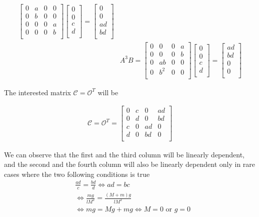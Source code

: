 \documentclass [12pt,letterpaper]{exam}
\begin{document}
\begin{align}
\begin{bmatrix}
0 & a & 0 & 0 \\
0 & b & 0 & 0 \\
0 & 0 & 0 & a \\
0 & 0 & 0 & b \\
\end{bmatrix} \begin{bmatrix}
0 \\
0 \\
c \\
d \\
\end{bmatrix} = \begin{bmatrix}
0 \\
0 \\
ad \\
bd \\
\end{bmatrix} \\
& A^3B = \begin{bmatrix}
0 & 0 & 0 & a \\
0 & 0 & 0 & b \\
0 & ab & 0 & 0 \\
0 & b^2 & 0 & 0 \\
\end{bmatrix} \begin{bmatrix}
0 \\
0 \\
c \\
d \\
\end{bmatrix} = \begin{bmatrix}
ad \\
bd \\
0 \\
0 \\
\end{bmatrix}
\end{align}

The interested matrix $\mathcal{C} = \mathcal{O}^T$ will be

\begin{align}
\mathcal{C} = \mathcal{O}^T = \begin{bmatrix}
0 & c & 0 & ad \\
0 & d & 0 & bd \\
c & 0 & ad & 0 \\
d & 0 & bd & 0 \\
\end{bmatrix}
\end{align}

We can observe that the first and the third column will be linearly dependent, and the second and the fourth column will also be linearly dependent only in rare cases where the two following conditions is true
\begin{align}
& \frac{ad}{c} = \frac{bd}{d} \Leftrightarrow ad = bc \\
& \Leftrightarrow \frac{mg}{lM^2} = \frac{(M + m)g}{lM^2} \\
& \Leftrightarrow mg = Mg + mg \Leftrightarrow M = 0 \mbox{ or } g = 0
\end{align}
\end{document}
